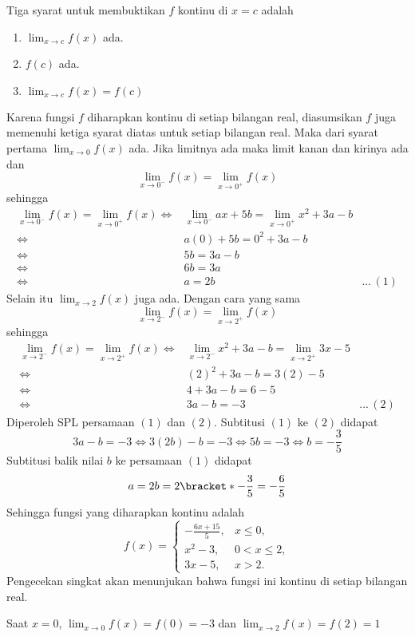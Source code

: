 \begin{enumerate}[leftmargin=*, label={\arabic*}.]
Tiga syarat untuk membuktikan $f$ kontinu di $x=c$ adalah
\begin{enumerate}[label={\arabic*}.]
    \item $\lim_{x\to c} f(x)$ ada.
    \item $f(c)$ ada.
    \item $\lim_{x\to c} f(x) = f(c)$
\end{enumerate}
Karena fungsi $f$ diharapkan kontinu di setiap bilangan real, diasumsikan $f$ 
juga memenuhi ketiga syarat diatas untuk setiap bilangan real. Maka dari syarat pertama 
$\lim_{x\to 0} f(x)$ ada. Jika limitnya ada maka limit kanan dan kirinya ada dan 
\[
\lim_{x\to 0^{-}} f(x) = \lim_{x\to 0^{+}} f(x)
\]
sehingga
\begin{align*}
    \lim_{x\to 0^{-}} f(x) = \lim_{x\to 0^{+}} f(x)
    \iff &\lim_{x\to 0^{-}} ax+5b = \lim_{x\to 0^{+}} x^{2}+3a-b\\
    \iff &a(0)+5b = 0^{2}+3a-b\\
    \iff &5b = 3a-b\\
    \iff &6b = 3a\\
    \iff &a = 2b &...\,(1)
\end{align*}
Selain itu $\lim_{x\to 2} f(x)$ juga ada. Dengan cara yang sama
\[
\lim_{x\to 2^{-}} f(x) = \lim_{x\to 2^{+}} f(x)
\]
sehingga
\begin{align*}
    \lim_{x\to 2^{-}} f(x) = \lim_{x\to 2^{+}} f(x)
    \iff &\lim_{x\to 2^{-}} x^{2}+3a-b = \lim_{x\to 2^{+}} 3x-5\\
    \iff &(2)^{2}+3a-b = 3(2)-5\\
    \iff &4+3a-b= 6-5\\
    \iff &3a-b=-3 &...\,(2)
\end{align*}
Diperoleh SPL persamaan $(1)$ dan $(2)$. Subtitusi $(1)$ ke $(2)$ didapat
\[
3a-b= -3 \iff 3(2b)-b = -3 \iff 5b = -3 \iff b = -\frac{3}{5}
\]
Subtitusi balik nilai $b$ ke persamaan $(1)$ didapat
\[
a = 2b = 2\bracket*{-\frac{3}{5}} = -\frac{6}{5}
\]
Sehingga fungsi yang diharapkan kontinu adalah 
\[
    f(x)=
    \begin{cases}
        -\frac{6x+15}{5}, &x \leq 0,\\
        x^2-3, &0 < x \leq 2,\\
        3x-5, &x > 2.
    \end{cases}
\]
Pengecekan singkat akan menunjukan bahwa fungsi ini kontinu di setiap bilangan 
real.

Saat $x=0$, $\lim_{x\to 0} f(x) = f(0)=-3$ dan $\lim_{x\to 2} f(x) = f(2)=1$


\end{enumerate}
